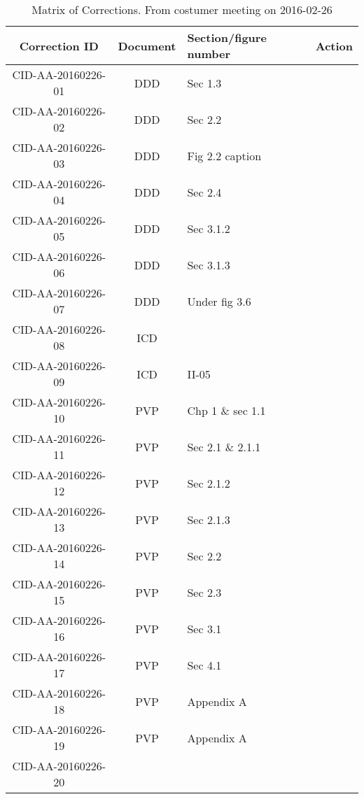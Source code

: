 \begin{table}[ht]
\centering
\begin{tabular}{|c|c|>{\centering\arraybackslash}p{3cm}|>{\centering\arraybackslash}p{5cm}|}
\hline \textbf{Correction ID} & \textbf{Document} & \textbf{Section/figure number} & \textbf{Action} \\ 
\hline CID-AA-20160226-01 & DDD & Sec 1.3 & \\ 
\hline CID-AA-20160226-02 & DDD & Sec 2.2 & \\ 
\hline CID-AA-20160226-03 & DDD & Fig 2.2 caption & \\ 
\hline CID-AA-20160226-04 & DDD & Sec 2.4 & \\ 
\hline CID-AA-20160226-05 & DDD & Sec 3.1.2 & \\ 
\hline CID-AA-20160226-06 & DDD & Sec 3.1.3 & \\ 
\hline CID-AA-20160226-07 & DDD & Under fig 3.6 & \\ 
\hline CID-AA-20160226-08 & ICD &  & \\ 
\hline CID-AA-20160226-09 & ICD & II-05 & \\ 
\hline CID-AA-20160226-10 & PVP & Chp 1 \& sec 1.1 & \\ 
\hline CID-AA-20160226-11 & PVP & Sec 2.1 \& 2.1.1 & \\ 
\hline CID-AA-20160226-12 & PVP & Sec 2.1.2 & \\ 
\hline CID-AA-20160226-13 & PVP & Sec 2.1.3 & \\ 
\hline CID-AA-20160226-14 & PVP & Sec 2.2 & \\ 
\hline CID-AA-20160226-15 & PVP & Sec 2.3 & \\ 
\hline CID-AA-20160226-16 & PVP & Sec 3.1 & \\ 
\hline CID-AA-20160226-17 & PVP & Sec 4.1 & \\ 
\hline CID-AA-20160226-18 & PVP & Appendix A & \\ 
\hline CID-AA-20160226-19 & PVP & Appendix A & \\ 
\hline CID-AA-20160226-20 &  &  & \\ 
\hline 
\end{tabular}
\caption{Matrix of Corrections. From costumer meeting on 2016-02-26}
\label{tb:MoC} 
\end{table}